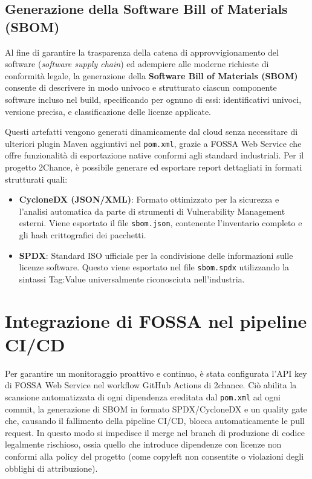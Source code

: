 \subsection{Generazione della Software Bill of Materials (SBOM)}

Al fine di garantire la trasparenza della catena di approvvigionamento del software (\textit{software supply chain}) ed adempiere alle moderne richieste di conformità legale, la generazione della \textbf{Software Bill of Materials (SBOM)} consente di descrivere in modo univoco e strutturato ciascun componente software incluso nel build, specificando per ognuno di essi: identificativi univoci, versione precisa, e classificazione delle licenze applicate.

Questi artefatti vengono generati dinamicamente dal cloud senza necessitare di ulteriori plugin Maven aggiuntivi nel \texttt{pom.xml}, grazie a FOSSA Web Service che offre funzionalità di esportazione native conformi agli standard industriali. Per il progetto 2Chance, è possibile generare ed esportare report dettagliati in formati strutturati quali:
\begin{itemize}
    \item \textbf{CycloneDX (JSON/XML)}: Formato ottimizzato per la sicurezza e l'analisi automatica da parte di strumenti di Vulnerability Management esterni. Viene esportato il file \texttt{sbom.json}, contenente l'inventario completo e gli hash crittografici dei pacchetti.
    \item \textbf{SPDX}: Standard ISO ufficiale per la condivisione delle informazioni sulle licenze software. Questo viene esportato nel file \texttt{sbom.spdx} utilizzando la sintassi Tag:Value universalmente riconosciuta nell'industria.
\end{itemize}

\section{Integrazione di FOSSA nel pipeline CI/CD} 

Per garantire un monitoraggio proattivo e continuo, è stata configurata l'API key di FOSSA Web Service nel workflow GitHub Actions di 2chance. Ciò abilita la scansione automatizzata di ogni dipendenza ereditata dal \texttt{pom.xml} ad ogni commit, la generazione di SBOM in formato SPDX/CycloneDX e un quality gate che, causando il fallimento della pipeline CI/CD, blocca automaticamente le pull request. In questo modo si impedisce il merge nel branch di produzione di codice legalmente rischioso, ossia quello che introduce dipendenze con licenze non conformi alla policy del progetto (come copyleft non consentite o violazioni degli obblighi di attribuzione).

